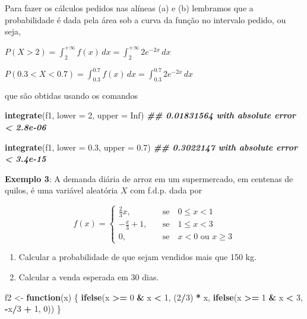 \documentclass[
]{book}
\newenvironment{Shaded}{\begin{snugshade}}{\end{snugshade}}
\newcommand{\AttributeTok}[1]{\textcolor[rgb]{0.13,0.29,0.53}{#1}}
\newcommand{\ConstantTok}[1]{\textcolor[rgb]{0.56,0.35,0.01}{#1}}
\newcommand{\ControlFlowTok}[1]{\textcolor[rgb]{0.13,0.29,0.53}{\textbf{#1}}}
\newcommand{\DecValTok}[1]{\textcolor[rgb]{0.00,0.00,0.81}{#1}}
\newcommand{\DocumentationTok}[1]{\textcolor[rgb]{0.56,0.35,0.01}{\textbf{\textit{#1}}}}
\newcommand{\FloatTok}[1]{\textcolor[rgb]{0.00,0.00,0.81}{#1}}
\newcommand{\FunctionTok}[1]{\textcolor[rgb]{0.13,0.29,0.53}{\textbf{#1}}}
\newcommand{\NormalTok}[1]{#1}
\newcommand{\OtherTok}[1]{\textcolor[rgb]{0.56,0.35,0.01}{#1}}
\newcommand{\SpecialCharTok}[1]{\textcolor[rgb]{0.81,0.36,0.00}{\textbf{#1}}}
\providecommand{\tightlist}{%
  \setlength{\itemsep}{0pt}\setlength{\parskip}{0pt}}
\begin{document}
Para fazer os cálculos pedidos nas alíneas (a) e (b) lembramos que a probabilidade é dada pela área sob a curva da função no intervalo pedido, ou seja,

\(P(X > 2) = \int_{2}^{+\infty}f(x)\, dx = \int_{2}^{+\infty} 2e^{-2x}\,dx\)

\(P(0.3 < X < 0.7) = \int_{0.3}^{0.7}f(x)\, dx = \int_{0.3}^{0.7} 2e^{-2x}\, dx\)

que são obtidas usando os comandos

\begin{Shaded}
\begin{Highlighting}[]
\FunctionTok{integrate}\NormalTok{(f1, }\AttributeTok{lower =} \DecValTok{2}\NormalTok{, }\AttributeTok{upper =} \ConstantTok{Inf}\NormalTok{)}
\DocumentationTok{\#\# 0.01831564 with absolute error \textless{} 2.8e{-}06}

\FunctionTok{integrate}\NormalTok{(f1, }\AttributeTok{lower =} \FloatTok{0.3}\NormalTok{, }\AttributeTok{upper =} \FloatTok{0.7}\NormalTok{)}
\DocumentationTok{\#\# 0.3022147 with absolute error \textless{} 3.4e{-}15}
\end{Highlighting}
\end{Shaded}

\textbf{Exemplo 3}: A demanda diária de arroz em um supermercado, em centenas de quilos, é uma variável aleatória \(X\) com f.d.p. dada por

\[f(x) = \begin{cases}
\frac{2}{3}x,& \quad \text{se} \quad 0\leq x <1 \\
-\frac{x}{3}+1,& \quad \text{se} \quad 1\leq x<3 \\
0,& \quad \text{se} \quad x<0 \,\, \text{ou} \,\, x\geq 3
\end{cases}\]

\begin{enumerate}
\def\labelenumi{(\alph{enumi})}
\tightlist
\item
  Calcular a probabilidade de que sejam vendidos mais que 150 kg.
\item
  Calcular a venda esperada em 30 dias.
\end{enumerate}

\begin{Shaded}
\begin{Highlighting}[]
\NormalTok{f2 }\OtherTok{\textless{}{-}} \ControlFlowTok{function}\NormalTok{(x) \{}
  \FunctionTok{ifelse}\NormalTok{(x }\SpecialCharTok{\textgreater{}=} \DecValTok{0} \SpecialCharTok{\&}\NormalTok{ x }\SpecialCharTok{\textless{}} \DecValTok{1}\NormalTok{, (}\DecValTok{2}\SpecialCharTok{/}\DecValTok{3}\NormalTok{) }\SpecialCharTok{*}\NormalTok{ x,}
         \FunctionTok{ifelse}\NormalTok{(x }\SpecialCharTok{\textgreater{}=} \DecValTok{1} \SpecialCharTok{\&}\NormalTok{ x }\SpecialCharTok{\textless{}} \DecValTok{3}\NormalTok{, }\SpecialCharTok{{-}}\NormalTok{x}\SpecialCharTok{/}\DecValTok{3} \SpecialCharTok{+} \DecValTok{1}\NormalTok{, }\DecValTok{0}\NormalTok{))}
\NormalTok{\}}
\end{Highlighting}
\end{Shaded}
\end{document}
